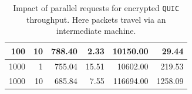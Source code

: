 \documentclass[12pt,a4paper,twoside,openright]{report}
\begin{document}
\begin{table}[H]
\begin{tabular}{|r|r|r|r|r|r|}
100                                                                                              & 10                                                                                                                         & 788.40                                                                                                                                          & 2.33                                                                                                                             & 10150.00                                                                                                 & 29.44                                                                                                                            \\ \hline
1000                                                                                             & 1                                                                                                                          & 755.04                                                                                                                                          & 15.51                                                                                                                            & 10602.00                                                                                                 & 219.53                                                                                                                           \\ \hline
1000                                                                                             & 10                                                                                                                         & 685.84                                                                                                                                          & 7.55                                                                                                                             & 116694.00                                                                                                & 1258.09                                                                                                                          \\ \hline
\end{tabular}
    \centering
    \caption{Impact of parallel requests for encrypted \texttt{QUIC} throughput. Here packets travel via an intermediate machine.}
    \label{fig:QUIC_throughput_via_B_using_parallel_requests}
\end{table}
\end{document}
